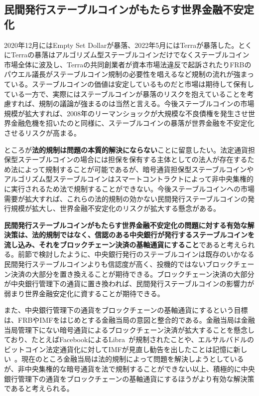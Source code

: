 \documentclass[dvipdfmx,a4paper]{jsarticle}
\begin{document}
\subsection{民間発行ステーブルコインがもたらす世界金融不安定化}

2020年12月にはEmpty Set Dollarが暴落、2022年5月にはTerraが暴落した。とくにTerraの暴落はアルゴリズム型ステーブルコインだけでなくステーブルコイン市場全体に波及し、Terraの共同創業者が資本市場法違反で起訴されたりFRBのパウエル議長がステーブルコイン規制の必要性を唱えるなど規制の流れが強まっている。ステーブルコインの価値は安定しているものだと市場は期待して保有している一方で、実際にはステーブルコインが暴落のリスクを抱えていることを考慮すれば、規制の議論が強まるのは当然と言える。今後ステーブルコインの市場規模が拡大すれば、2008年のリーマンショックが大規模な不良債権を発生させ世界金融危機を招いたのと同様に、ステーブルコインの暴落が世界金融を不安定化させるリスクが高まる。

ところが\textbf{法的規制は問題の本質的解決にならない}ことに留意したい。法定通貨担保型ステーブルコインの場合には担保を保有する主体としての法人が存在するため法によって規制することが可能であるが、暗号通貨担保型ステーブルコインやアルゴリズム型ステーブルコインはスマートコントラクトによって非中央集権的に実行されるため法で規制することができない。今後ステーブルコインへの市場需要が拡大すれば、これらの法的規制の効かない民間発行ステーブルコインの発行規模が拡大し、世界金融不安定化のリスクが拡大する懸念がある。

\textbf{民間発行ステーブルコインがもたらす世界金融不安定化の問題に対する有効な解決策は、法的規制ではなく、信認のある中央銀行が発行するステーブルコインを流し込み、それをブロックチェーン決済の基軸通貨にすること}であると考えられる。前節で検討したように、中央銀行発行のステーブルコインは既存のいかなる民間発行ステーブルコインよりも信認度が高く、投機的ではないブロックチェーン決済の大部分を置き換えることが期待できる。ブロックチェーン決済の大部分が中央銀行管理下の通貨に置き換われば、民間発行ステーブルコインの影響力が弱まり世界金融安定化に資することが期待できる。

また、中央銀行管理下の通貨をブロックチェーンの基軸通貨にするという目標は、FRBやIMFをはじめとする金融当局の意図と整合的である。金融当局は金融当局管理下にない暗号通貨によるブロックチェーン決済が拡大することを懸念しており、たとえばFacebookによるLibra~\cite{libra}が規制されたことや、エルサルバドルのビットコイン法定通貨化に対してIMFが見直し勧告を出したことは記憶に新しい~\cite{imfelsalvador}。現在のところ金融当局は法的規制によって問題を解決しようとしているが、非中央集権的な暗号通貨を法で規制することができない以上、積極的に中央銀行管理下の通貨をブロックチェーンの基軸通貨にするほうがより有効な解決策であると考えられる。
\end{document}

